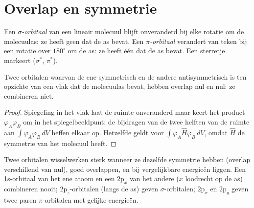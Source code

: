 \section{Overlap en symmetrie}

\begin{definition}\label{def:b2:diatomic-mos:sigma-pi}
Een \emph{$\sigma$-orbitaal} van een lineair molecuul blijft onveranderd bij elke
rotatie om de molecuulas: ze heeft geen  dat de as bevat. Een
\emph{$\pi$-orbitaal} verandert van teken bij een rotatie over $180^\circ$ om de
as: ze heeft één  dat de as bevat. Een sterretje markeert  ($\sigma^*$, $\pi^*$).
\end{definition}

\begin{proposition}\label{prop:b2:diatomic-mos:symmetry}
Twee orbitalen waarvan de ene symmetrisch en de andere antisymmetrisch is ten opzichte
van een vlak dat de molecuulas bevat, hebben overlap nul en 
nul: ze combineren niet.
\end{proposition}

\begin{proof}
Spiegeling in het vlak laat de ruimte onveranderd maar keert het product
$\varphi_A\varphi_B$ om in het spiegelbeeldpunt: de bijdragen van de
twee helften van de ruimte aan $\int\varphi_A\varphi_B\,dV$ heffen elkaar op. Hetzelfde geldt voor
$\int\varphi_A\hat H\varphi_B\,dV$, omdat $\hat H$ de symmetrie van het molecuul heeft.
\end{proof}

Twee orbitalen wisselwerken sterk wanneer ze dezelfde symmetrie hebben (overlap verschillend
van nul), goed overlappen, en bij vergelijkbare energieën liggen. Een 1s-orbitaal van het ene atoom en een
$2\mathrm p_x$ van het andere ($x$ loodrecht op de as) combineren nooit;
$2\mathrm p_z$-orbitalen (langs de as) geven $\sigma$-orbitalen; $2\mathrm p_x$ en
$2\mathrm p_y$ geven twee paren $\pi$-orbitalen met gelijke energieën.


